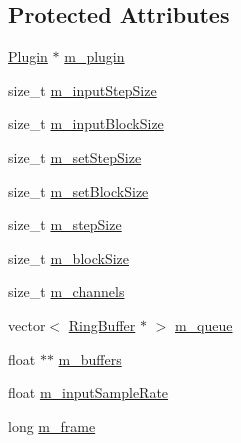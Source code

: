 \subsection*{Protected Attributes}
\begin{DoxyCompactItemize}
\item 
\hyperlink{class_vamp_1_1_plugin}{Plugin} $\ast$ \hyperlink{class_vamp_1_1_host_ext_1_1_plugin_buffering_adapter_1_1_impl_a9c9acb7f9bf51b7406c15d2e60fd4ce2}{m\+\_\+plugin}
\item 
size\+\_\+t \hyperlink{class_vamp_1_1_host_ext_1_1_plugin_buffering_adapter_1_1_impl_a6140f55c9120314194d3e73a54b25139}{m\+\_\+input\+Step\+Size}
\item 
size\+\_\+t \hyperlink{class_vamp_1_1_host_ext_1_1_plugin_buffering_adapter_1_1_impl_a2a8d125110b2ee19407d10b4e21a865f}{m\+\_\+input\+Block\+Size}
\item 
size\+\_\+t \hyperlink{class_vamp_1_1_host_ext_1_1_plugin_buffering_adapter_1_1_impl_abc262019ad958eff91de177a6040540b}{m\+\_\+set\+Step\+Size}
\item 
size\+\_\+t \hyperlink{class_vamp_1_1_host_ext_1_1_plugin_buffering_adapter_1_1_impl_a2a00da220493d24e0e980570d90432f0}{m\+\_\+set\+Block\+Size}
\item 
size\+\_\+t \hyperlink{class_vamp_1_1_host_ext_1_1_plugin_buffering_adapter_1_1_impl_a23535474c13c9ed9c2a3dfdcb0943050}{m\+\_\+step\+Size}
\item 
size\+\_\+t \hyperlink{class_vamp_1_1_host_ext_1_1_plugin_buffering_adapter_1_1_impl_a7f5f42ff4da0046f38579e9d0f384144}{m\+\_\+block\+Size}
\item 
size\+\_\+t \hyperlink{class_vamp_1_1_host_ext_1_1_plugin_buffering_adapter_1_1_impl_a3b8801196c981a9953f6f1fbf5a8aabd}{m\+\_\+channels}
\item 
vector$<$ \hyperlink{class_vamp_1_1_host_ext_1_1_plugin_buffering_adapter_1_1_impl_1_1_ring_buffer}{Ring\+Buffer} $\ast$ $>$ \hyperlink{class_vamp_1_1_host_ext_1_1_plugin_buffering_adapter_1_1_impl_ad7bc92f4e299bab75d91fbaa08d7c683}{m\+\_\+queue}
\item 
float $\ast$$\ast$ \hyperlink{class_vamp_1_1_host_ext_1_1_plugin_buffering_adapter_1_1_impl_ad0b81884ecf1f01e8272667e59cce02e}{m\+\_\+buffers}
\item 
float \hyperlink{class_vamp_1_1_host_ext_1_1_plugin_buffering_adapter_1_1_impl_acc747b4e448a316346f9f59e2c85dcfc}{m\+\_\+input\+Sample\+Rate}
\item 
long \hyperlink{class_vamp_1_1_host_ext_1_1_plugin_buffering_adapter_1_1_impl_a26fe691e7c9ddf55bb55b3d4eb80d8a7}{m\+\_\+frame}
$$
\end{DoxyCompactItemize}
